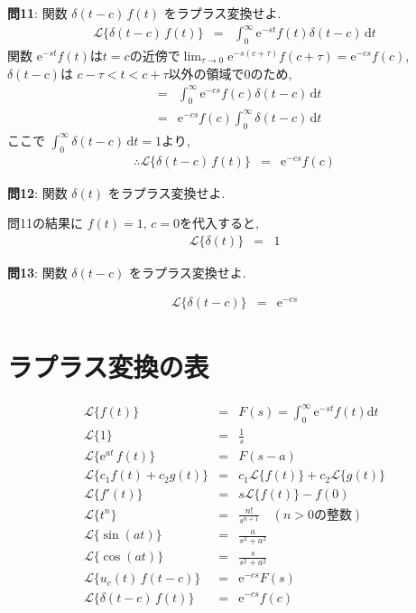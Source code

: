 ﻿\documentclass[a4j]{jarticle}
\begin{document}
\noindent
\large{\bf{問11}}: 関数 \( \delta(t-c)\,f(t) \) をラプラス変換せよ.
\begin{eqnarray*}
\mathcal{L} \{ \delta(t-c)\,f(t) \} &=& \int_{0}^{\infty}{ \mathrm{e}^{-st}f(t)\delta(t-c) \, \mathrm{d}t}
\end{eqnarray*}
%
関数 \( \mathrm{e}^{-st}f(t) \text{は} t=c \text{の近傍で} \lim_{\tau \to 0}\mathrm{e}^{-s(c+\tau)}f(c+\tau) = \mathrm{e}^{-cs}f(c) \),
\( \delta(t-c) \)は \( c-\tau <t < c+\tau \)以外の領域で0のため, 
%
\begin{eqnarray*}
&=& \int_{0}^{\infty}{ \mathrm{e}^{-cs}f(c)\delta(t-c) \, \mathrm{d}t} \\
&=& \mathrm{e}^{-cs}f(c)\int_{0}^{\infty}{ \delta(t-c) \, \mathrm{d}t}
\end{eqnarray*}
ここで \( \int_{0}^{\infty}{ \delta(t-c) \, \mathrm{d}t } = 1 \)より,
\begin{eqnarray*}
\therefore \mathcal{L} \{ \delta(t-c)\,f(t) \} &=& \mathrm{e}^{-cs}f(c)
\end{eqnarray*}

\noindent
\large{\bf{問12}}: 関数 \( \delta(t) \) をラプラス変換せよ.

問11の結果に \( f(t) = 1 ,\, c=0 \)を代入すると,
\begin{eqnarray*}
\mathcal{L} \{ \delta(t) \} &=& 1
\end{eqnarray*}

\noindent
\large{\bf{問13}}: 関数 \( \delta(t-c) \) をラプラス変換せよ.

\begin{eqnarray*}
\mathcal{L} \{ \delta(t-c) \} &=& \mathrm{e}^{-cs}
\end{eqnarray*}

\section{ラプラス変換の表}
%
\begin{eqnarray*}
                 \mathcal{L} \{ f(t) \} &=& F(s) = \int_0^\infty \mathrm{e}^{-st}f(t)\mathrm{d}t \\
                    \mathcal{L} \{ 1 \} &=& \frac{1}{s} \\
\mathcal{L} \{ \mathrm{e}^{at}\,f(t) \} &=& F(s-a) \\
 \mathcal{L} \{  c_1 f(t) + c_2 g(t) \} &=& c_1 \mathcal{L} \{ f(t) \} + c_2 \mathcal{L} \{ g(t) \} \\
               \mathcal{L} \{  f'(t) \} &=& s \mathcal{L} \{  f(t) \} - f(0) \\
                  \mathcal{L} \{ t^n \} &=& \frac{n!}{s^{n+1}} \quad (n > 0 \text{の整数} ) \\
             \mathcal{L} \{ \sin(at) \} &=& \frac{a}{s^2 + a^2} \\
             \mathcal{L} \{ \cos(at) \} &=& \frac{s}{s^2 + a^2} \\
       \mathcal{L} \{ u_c(t)\,f(t-c) \} &=& \mathrm{e}^{-cs}F(s) \\
    \mathcal{L} \{ \delta(t-c)\,f(t) \} &=& \mathrm{e}^{-cs}f(c) \\
\end{eqnarray*}
\end{document}
